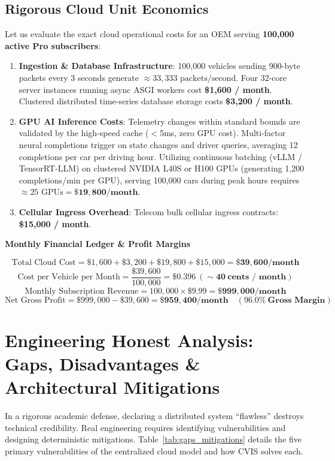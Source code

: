 \documentclass[12pt,a4paper]{report}
\newenvironment{ccnsbox}[1]{%
  \begin{mdframed}[backgroundcolor=cvislightbg,
    linecolor=cvisblue,linewidth=1.5pt,
    innerleftmargin=10pt,innerrightmargin=10pt,
    innertopmargin=6pt,innerbottommargin=6pt]
  \textbf{\color{cvisblue}#1}\par\smallskip}
  {\end{mdframed}}
\begin{document}
\subsection{Rigorous Cloud Unit Economics}

Let us evaluate the exact cloud operational costs for an OEM serving \textbf{100,000 active Pro subscribers}:
\begin{enumerate}[leftmargin=1.5cm]
  \item \textbf{Ingestion \& Database Infrastructure}: 100,000 vehicles sending 900-byte packets every 3 seconds generate $\approx 33,333\text{ packets/second}$. Four 32-core server instances running async ASGI workers cost \textbf{\$1,600 / month}. Clustered distributed time-series database storage costs \textbf{\$3,200 / month}.
  \item \textbf{GPU AI Inference Costs}: Telemetry changes within standard bounds are validated by the high-speed cache ($<$5ms, zero GPU cost). Multi-factor neural completions trigger on state changes and driver queries, averaging 12 completions per car per driving hour. Utilizing continuous batching (vLLM / TensorRT-LLM) on clustered NVIDIA L40S or H100 GPUs (generating 1,200 completions/min per GPU), serving 100,000 cars during peak hours requires $\approx 25\text{ GPUs} = \mathbf{\$19,800 / \text{month}}$.
  \item \textbf{Cellular Ingress Overhead}: Telecom bulk cellular ingress contracts: \textbf{\$15,000 / month}.
\end{enumerate}

\begin{ccnsbox}{Monthly Financial Ledger \& Profit Margins}
$$\text{Total Cloud Cost} = \$1,600 + \$3,200 + \$19,800 + \$15,000 = \mathbf{\$39,600 / \text{month}}$$
$$\text{Cost per Vehicle per Month} = \frac{\$39,600}{100,000} = \mathbf{\$0.396\ (\sim 40\ \text{cents / month})}$$
$$\text{Monthly Subscription Revenue} = 100,000 \times \$9.99 = \mathbf{\$999,000 / \text{month}}$$
$$\text{Net Gross Profit} = \$999,000 - \$39,600 = \mathbf{\$959,400 / \text{month}}\quad (\mathbf{96.0\%\ \text{Gross Margin}})$$
\end{ccnsbox}

\section{Engineering Honest Analysis: Gaps, Disadvantages \& Architectural Mitigations}

In a rigorous academic defense, declaring a distributed system ``flawless'' destroys technical credibility. Real engineering requires identifying vulnerabilities and designing deterministic mitigations. Table~\ref{tab:gaps_mitigations} details the five primary vulnerabilities of the centralized cloud model and how CVIS solves each.
\end{document}
